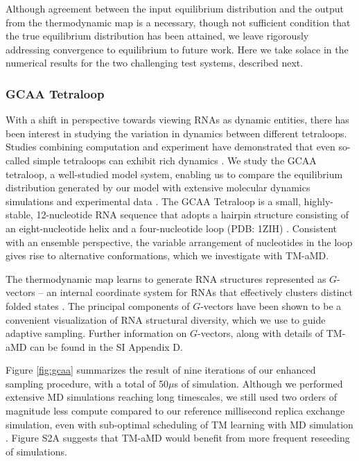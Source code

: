 \documentclass[9pt,twocolumn,twoside]{pnas-new}
\begin{document}
{Although agreement between the input equilibrium distribution and the output from the thermodynamic map is a necessary, though not sufficient condition that the true equilibrium distribution has been attained, we leave rigorously addressing convergence to equilibrium to future work. Here we take solace in the numerical results for the two challenging test systems, described next. 

\subsubsection{GCAA Tetraloop}

With a shift in perspective towards viewing RNAs as dynamic entities, there has been interest in studying the variation in dynamics between different tetraloops. Studies combining computation and experiment have demonstrated that even so-called simple tetraloops can exhibit rich dynamics \cite{kresten-jacs}. We study the GCAA tetraloop, a well-studied model system, enabling us to compare the equilibrium distribution generated by our model with extensive molecular dynamics simulations and experimental data \cite{debenedetti-rna,DE-Shaw-RNA-ff,gcaa-melt}. The GCAA Tetraloop is a small, highly-stable, 12-nucleotide RNA sequence that adopts a hairpin structure consisting of an eight-nucleotide helix and a four-nucleotide loop (PDB: 1ZIH) \cite{gcaa-nmr}. Consistent with an ensemble perspective, the variable arrangement of nucleotides in the loop gives rise to alternative conformations, which we investigate with TM-aMD.

The thermodynamic map learns to generate RNA structures represented as $G$-vectors -- an internal coordinate system for RNAs that effectively clusters distinct folded states \cite{gvecs-bussi}. The principal components of $G$-vectors have been shown to be a convenient visualization of RNA structural diversity, which we use to guide adaptive sampling. Further information on $G$-vectors, along with details of TM-aMD can be found in the SI Appendix D.

Figure \ref{fig:gcaa} summarizes the result of nine iterations of our enhanced sampling procedure, with a total of 50$\mu$s of simulation. Although we performed extensive MD simulations reaching long timescales, we still used two orders of magnitude less compute compared to our reference millisecond replica exchange simulation, even with sub-optimal scheduling of TM learning with MD simulation  \cite{DE-Shaw-RNA-ff}. Figure S2A suggests that TM-aMD would benefit from more frequent reseeding of simulations.

}
\end{document}
